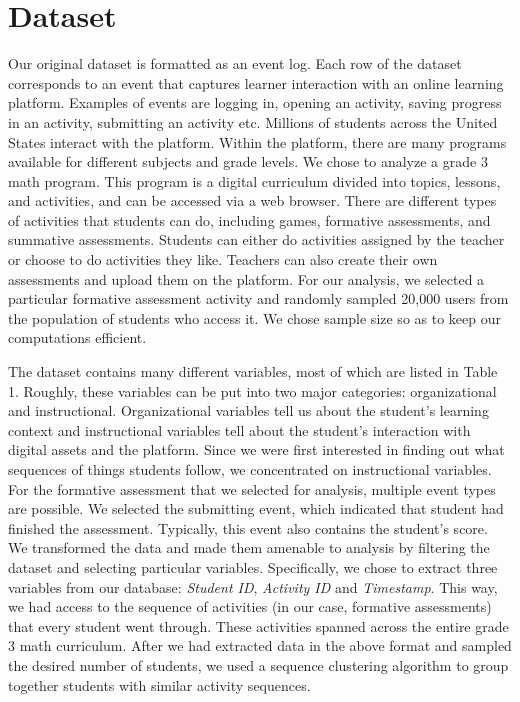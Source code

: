 \documentclass{edm_template}
\begin{document}
\section{Dataset}
Our original dataset is formatted as an event log. Each row of the dataset corresponds to an event that captures learner interaction with an online learning platform. Examples of events are logging in, opening an activity, saving progress in an activity, submitting an activity etc. Millions of students across the United States interact with the platform. Within the platform, there are many programs available for different subjects and grade levels. We chose to analyze a grade 3 math program. This program is a digital curriculum divided into topics, lessons, and activities, and can be accessed via a web browser. There are different types of activities that students can do, including games, formative assessments, and summative assessments. Students can either do activities assigned by the teacher or choose to do activities they like. Teachers can also create their own assessments and upload them on the platform. For our analysis, we selected a particular formative assessment activity and randomly sampled 20,000 users from the population of students who access it. We chose sample size so as to keep our computations efficient.

The dataset contains many different variables, most of which are listed in Table 1. Roughly, these variables can be put into two major categories: organizational and instructional. Organizational variables tell us about the student's learning context and instructional variables tell about the student's interaction with digital assets and the platform. Since we were first interested in finding out what sequences of things students follow, we concentrated on instructional variables. For the formative assessment that we selected for analysis, multiple event types are possible. We selected the submitting event, which indicated that student had finished the assessment. Typically, this event also contains the student's score. We transformed the data and made them amenable to analysis by filtering the dataset and selecting particular variables. Specifically, we chose to extract three variables from our database: \textit{Student ID}, \textit{Activity ID} and \textit{Timestamp}. This way, we had access to the sequence of activities (in our case, formative assessments) that every student went through. These activities spanned across the entire grade 3 math curriculum. After we had extracted data in the above format and sampled the desired number of students, we used a sequence clustering algorithm to group together students with similar activity sequences.
\end{document}
